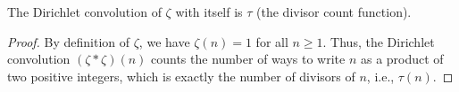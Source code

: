 \begin{theorem}
\label{zeta_mul_zeta}
\leanok
The Dirichlet convolution of $\zeta$ with itself is $\tau$ (the divisor count function).
\end{theorem}
\begin{proof}
\leanok
By definition of $\zeta$, we have $\zeta(n) = 1$ for all $n \geq 1$. Thus, the Dirichlet convolution
  $(\zeta * \zeta)(n)$ counts the number of ways to write $n$ as a product of two positive integers,
  which is exactly the number of divisors of $n$, i.e., $\tau(n)$.
\end{proof}
